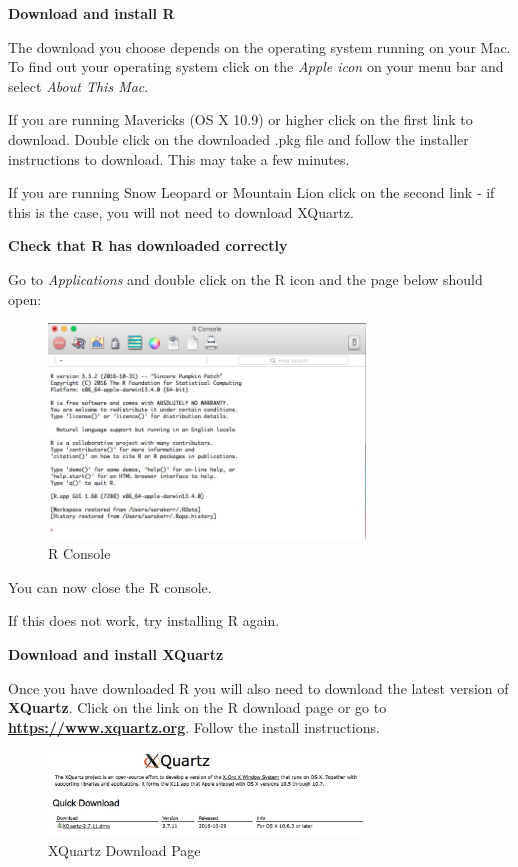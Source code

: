 \documentclass[12pt]{article}
\begin{document}
\textbf{Download and install R}

The download you choose depends on the operating system running on your Mac. To find out your operating system click on the \textit{Apple icon} on your menu bar and select \textit{About This Mac}.

If you are running Mavericks (OS X 10.9) or higher click on the first link to download. Double click on the downloaded .pkg file and follow the installer instructions to download. This may take a few minutes.

If you are running Snow Leopard or Mountain Lion click on the second link - if this is the case, you will not need to download XQuartz.

\textbf{Check that R has downloaded correctly}

Go to \textit{Applications} and double click on the R icon and the page below should open:

\begin{figure}[H]
	\centering
	\includegraphics[width=0.75\textwidth]{rconsole.jpg}
	\caption{R Console}
\end{figure}

You can now close the R console.

If this does not work, try installing R again.

\textbf{Download and install XQuartz}

Once you have downloaded R you will also need to download the latest version of \textbf{XQuartz}. Click on the link on the R download page or go to \textbf{\url{https://www.xquartz.org}}. Follow the install instructions.

\begin{figure}[H]
	\centering
	\includegraphics[width=0.75\textwidth]{xquartz.jpg}
	\caption{XQuartz Download Page}
\end{figure}
\end{document}

